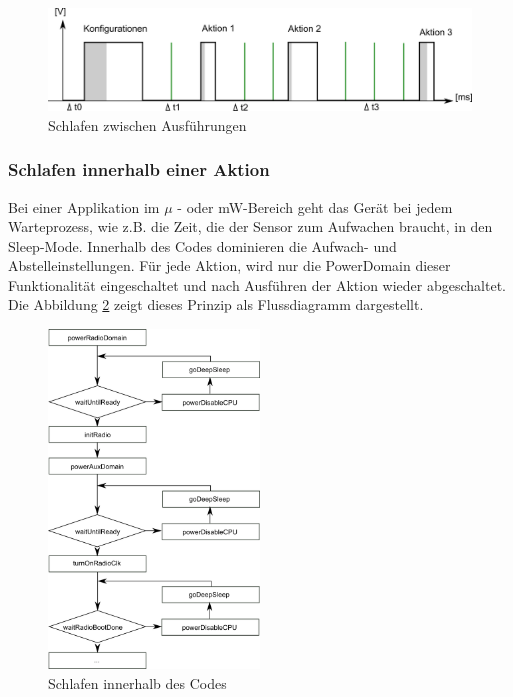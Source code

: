 \begin{figure}[ht]
    \includegraphics[width=\textwidth]{2TheoretischeGrundlagen/imag/SleepGrundprinzip.png}
    \caption{Schlafen zwischen Ausführungen}
    \label{sleep_Grundprinzip} 
\end{figure}

\subsubsection{Schlafen innerhalb einer Aktion}
Bei einer Applikation im $\mu$ - oder mW-Bereich geht das Gerät bei jedem Warteprozess, wie z.B. die Zeit, die der Sensor zum Aufwachen braucht, in den Sleep-Mode. Innerhalb des Codes dominieren die Aufwach- und Abstelleinstellungen. Für jede Aktion, wird nur die PowerDomain dieser Funktionalität eingeschaltet und nach Ausführen der Aktion wieder abgeschaltet. Die Abbildung \ref{sleep_intern} zeigt dieses Prinzip als Flussdiagramm dargestellt.

\begin{figure}[ht]
    \includegraphics[width=0.5\textwidth]{2TheoretischeGrundlagen/imag/SleepInFunktion.png}
    \caption{Schlafen innerhalb des Codes}
    \label{sleep_intern} 
\end{figure}


